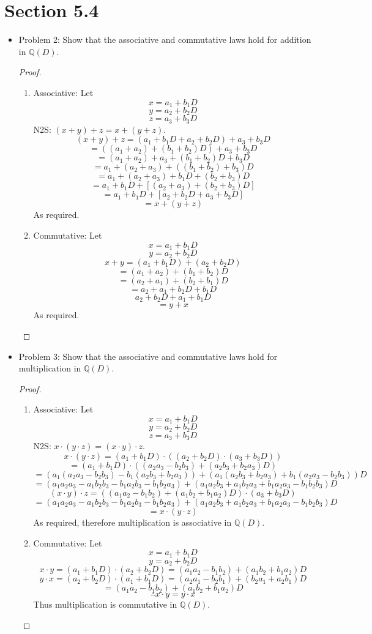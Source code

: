 \documentclass[hidelinks,12pt]{article}
\title{\scalebox{2}{Math 531 Homework 9}}
\author{\scalebox{1.5}{Theo Koss}}
\date{April 2021}
\newcommand{\Q}{\mathbb{Q}}
\begin{document}
\maketitle
\section{Section 5.4}
\begin{itemize}
\item Problem 2: Show that the associative and commutative laws hold for addition in $\Q(D)$.\begin{proof}\begin{enumerate}[label=(\alph*)]
    \item Associative: Let $$x=a_1+b_1D$$ $$y=a_2+b_2D$$ $$z=a_3+b_3D$$ N2S: $(x+y)+z=x+(y+z)$. $$(x+y)+z=(a_1+b_1D+a_2+b_2D)+a_3+b_3D$$ $$=((a_1+a_2)+(b_1+b_2)D)+a_3+b_3D$$ $$=(a_1+a_2)+a_3+(b_1+b_2)D+b_3D$$ $$=a_1+(a_2+a_3)+((b_1+b_2)+b_3)D$$ $$=a_1+(a_2+a_3)+b_1D+(b_2+b_3)D$$ $$=a_1+b_1D+[(a_2+a_3)+(b_2+b_3)D]$$ $$=a_1+b_1D+[a_2+b_2D+a_3+b_3D]$$ $$=x+(y+z)$$ As required.
    \item Commutative: Let $$x=a_1+b_1D$$ $$y=a_2+b_2D$$ $$x+y=(a_1+b_1D)+(a_2+b_2D)$$ $$=(a_1+a_2)+(b_1+b_2)D$$ $$=(a_2+a_1)+(b_2+b_1)D$$ $$=a_2+a_1+b_2D+b_1D$$ $$a_2+b_2D+a_1+b_1D$$ $$=y+x$$ As required.
 \end{enumerate}
\end{proof}
\item Problem 3: Show that the associative and commutative laws hold for multiplication in $\Q(D)$.\begin{proof}\begin{enumerate}[label=(\alph*)]
\item Associative: Let $$x=a_1+b_1D$$ $$y=a_2+b_2D$$ $$z=a_3+b_3D$$ N2S: $x\cdot (y\cdot z)=(x\cdot y)\cdot z$. $$x\cdot (y\cdot z)=(a_1+b_1D)\cdot((a_2+b_2D)\cdot(a_3+b_3D))$$ $$=(a_1+b_1D)\cdot((a_2a_3-b_2b_3)+(a_2b_3+b_2a_3)D)$$ $$=(a_1(a_2a_3-b_2b_3)-b_1(a_2b_3+b_2a_3))+(a_1(a_2b_3+b_2a_3)+b_1(a_2a_3-b_2b_3))D$$ $$=(a_1a_2a_3-a_1b_2b_3-b_1a_2b_3-b_1b_2a_3)+(a_1a_2b_3+a_1b_2a_3+b_1a_2a_3-b_1b_2b_3)D$$ 
$$(x\cdot y)\cdot z=((a_1a_2-b_1b_2)+(a_1b_2+b_1a_2)D)\cdot(a_3+b_3D)$$ $$=(a_1a_2a_3-a_1b_2b_3-b_1a_2b_3-b_1b_2a_3)+(a_1a_2b_3+a_1b_2a_3+b_1a_2a_3-b_1b_2b_3)D$$ $$=x\cdot (y\cdot z)$$ As required, therefore multiplication is associative in $\Q(D)$.

\item Commutative: Let $$x=a_1+b_1D$$ $$y=a_2+b_2D$$ $$x\cdot y=(a_1+b_1D)\cdot(a_2+b_2D)=(a_1a_2-b_1b_2)+(a_1b_2+b_1a_2)D$$ $$y\cdot x=(a_2+b_2D)\cdot(a_1+b_1D)=(a_2a_1-b_2b_1)+(b_2a_1+a_2b_1)D$$ $$=(a_1a_2-b_1b_2)+(a_1b_2+b_1a_2)D$$
$$\therefore x\cdot y=y\cdot x$$ Thus multiplication is commutative in $\Q(D)$.
\end{enumerate}
\end{proof}
\end{itemize}
\end{document}
